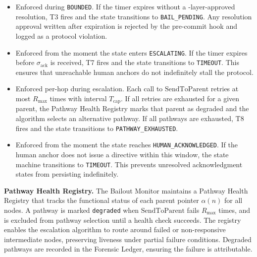 \begin{itemize}\itemsep=0pt
\item[$T_{\text{bounds}}$] Enforced during \texttt{BOUNDED}. If the timer expires without a \fact-layer-approved resolution, T3 fires and the state transitions to \texttt{BAIL\_PENDING}. Any resolution approval written after expiration is rejected by the pre-commit hook and logged as a protocol violation.

\item[$T_{\text{prop}}$] Enforced from the moment the state enters \texttt{ESCALATING}. If the timer expires before $\sigma_{\text{ack}}$ is received, T7 fires and the state transitions to \texttt{TIMEOUT}. This ensures that unreachable human anchors do not indefinitely stall the protocol.

\item[$T_{\text{cap}}$] Enforced per-hop during escalation. Each call to $\text{SendToParent}$ retries at most $R_{\max}$ times with interval $T_{\text{cap}}$. If all retries are exhausted for a given parent, the Pathway Health Registry marks that parent as degraded and the algorithm selects an alternative pathway. If all pathways are exhausted, T8 fires and the state transitions to \texttt{PATHWAY\_EXHAUSTED}.

\item[$T_{\text{human}}$] Enforced from the moment the state reaches \texttt{HUMAN\_ACKNOWLEDGED}. If the human anchor does not issue a directive within this window, the state machine transitions to \texttt{TIMEOUT}. This prevents unresolved acknowledgment states from persisting indefinitely.
\end{itemize}

\medskip
\noindent\textbf{Pathway Health Registry.} The Bailout Monitor maintains a Pathway Health Registry that tracks the functional status of each parent pointer $\alpha(n)$ for all nodes. A pathway is marked \texttt{degraded} when $\text{SendToParent}$ fails $R_{\max}$ times, and is excluded from pathway selection until a health check succeeds. The registry enables the escalation algorithm to route around failed or non-responsive intermediate nodes, preserving liveness under partial failure conditions. Degraded pathways are recorded in the Forensic Ledger, ensuring the failure is attributable.

